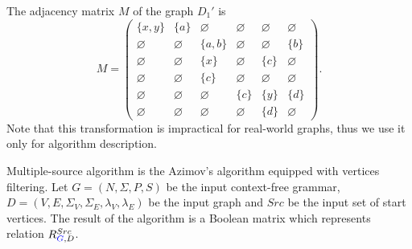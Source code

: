 {The adjacency matrix $M$ of the graph $D_1'$ is
{
    \renewcommand{\arraystretch}{0.7}
    \setlength\arraycolsep{2pt}
$$
    M =
    \begin{pmatrix}
    \{x, y\}     & \{a\}       & \varnothing & \varnothing & \varnothing & \varnothing \\
    \varnothing  & \varnothing & \{a, b\}    & \varnothing & \varnothing & \{b\}       \\
    \varnothing  & \varnothing & \{x\}       & \varnothing & \{c\}       & \varnothing \\
    \varnothing  & \varnothing & \{c\}       & \varnothing & \varnothing & \varnothing \\
    \varnothing  & \varnothing & \varnothing & \{c\}       & \{y\}       & \{d\}       \\
    \varnothing  & \varnothing & \varnothing & \varnothing & \{d\}       & \varnothing
    \end{pmatrix}.
$$
}
Note that this transformation is impractical for real-world graphs, thus we use it only for algorithm description.}

Multiple-source algorithm is the Azimov's algorithm equipped with vertices filtering.
Let $G = (N, \Sigma, P, S)$ be the input context-free grammar, $D = (V, E, \Sigma_V, \Sigma_E, \lambda_V, \lambda_E)$ be the input graph and $Src$ be the input set of start vertices.
The result of the algorithm is a Boolean matrix which represents relation $R_{{\color{blue}{G}},D}^{Src}$.

